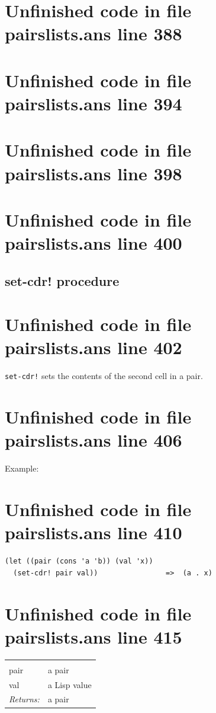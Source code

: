 \documentclass[twoside,9pt]{report}
\begin{document}
\section{Unfinished code in file pairslists.ans line 388}
\section{Unfinished code in file pairslists.ans line 394}
\section{Unfinished code in file pairslists.ans line 398}
\section{Unfinished code in file pairslists.ans line 400}
\subsection{set-cdr! procedure}
\label{set-cdr"!-procedure}
\section{Unfinished code in file pairslists.ans line 402}


\texttt{set-cdr!} sets the contents of the second cell in a pair.

\section{Unfinished code in file pairslists.ans line 406}


Example:

\section{Unfinished code in file pairslists.ans line 410}
\begin{verbatim}
(let ((pair (cons 'a 'b)) (val 'x))
  (set-cdr! pair val))                =>  (a . x)
\end{verbatim}
\section{Unfinished code in file pairslists.ans line 415}
\noindent\begin{tabular}{ |p{1.9cm} p{8cm}| }
\hline
\rowcolor[HTML]{CCCCCC} \multicolumn{2}{|l|}{\bf set-cdr! (public)} \\
pair & a pair \\
val & a Lisp value \\
\textit{Returns:} & a pair \\
\hline
\end{tabular}
\end{document}
